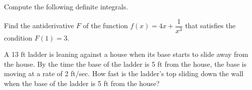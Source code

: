 \documentclass[addpoints,12pt]{exam}
\begin{document}
\begin{questions}




\question Compute the following definite integrals.


\newpage


\vfill




\question[8] Find the antiderivative $F$ of the function $f(x) = 4x+ \dfrac{1}{x^3}$ that satisfies
the condition $F(1) = 3.$

\vfill

\newpage

\question[10] A 13 ft ladder is leaning against a house when its base starts to slide away from
the house. By the time the base of the ladder is 5 ft from the house, the base is moving at a rate
of 2 ft/sec. How fast is the ladder’s top sliding down the wall when the base of the ladder is 5 ft
from the house?


\end{questions}
\end{document}
